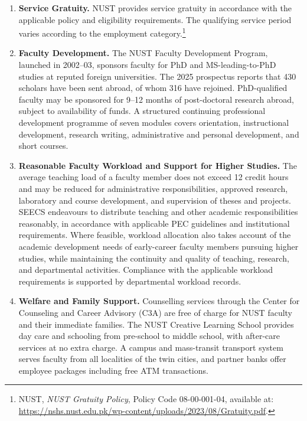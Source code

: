 \begin{enumerate}
    \item \textbf{Service Gratuity.}
    NUST provides service gratuity in accordance with the applicable policy
    and eligibility requirements. The qualifying service period varies
    according to the employment category.\footnote{NUST, \textit{NUST
    Gratuity Policy}, Policy Code 08-00-001-04, available at:
    \url{https://nshs.nust.edu.pk/wp-content/uploads/2023/08/Gratuity.pdf}.}

    \item \textbf{Faculty Development.}
    The NUST Faculty Development Program, launched in 2002--03, sponsors
    faculty for PhD and MS-leading-to-PhD studies at reputed foreign
    universities. The 2025 prospectus reports that 430 scholars have been
    sent abroad, of whom 316 have rejoined. PhD-qualified faculty may be
    sponsored for 9--12 months of post-doctoral research abroad, subject to
    availability of funds. A structured continuing professional development
    programme of seven modules covers orientation, instructional
    development, research writing, administrative and personal development,
    and short courses.

    \item \textbf{Reasonable Faculty Workload and Support for Higher
    Studies.}
    The average teaching load of a faculty member does not exceed 12 credit hours and may be reduced for administrative responsibilities, approved research, laboratory and course
    development, and supervision of theses and projects. SEECS endeavours to
    distribute teaching and other academic responsibilities reasonably, in
    accordance with applicable PEC guidelines and institutional requirements.
    Where feasible, workload allocation also takes account of the academic
    development needs of early-career faculty members pursuing higher
    studies, while maintaining the continuity and quality of teaching,
    research, and departmental activities. Compliance with the applicable
    workload requirements is supported by departmental workload records.

    \item \textbf{Welfare and Family Support.}
    Counselling services through the Center for Counseling and Career
    Advisory (C3A) are free of charge for NUST faculty and their immediate
    families. The NUST Creative Learning School provides day care and
    schooling from pre-school to middle school, with after-care services at no
    extra charge. A campus and mass-transit transport system serves faculty
    from all localities of the twin cities, and partner banks offer employee
    packages including free ATM transactions.
\end{enumerate}

